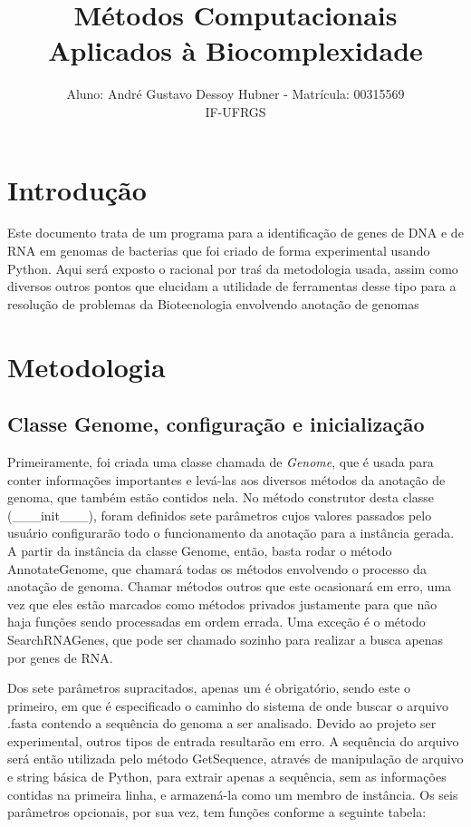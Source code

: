 \documentclass[brazilian,12pt,a4paper,final]{article}
\title{Métodos Computacionais Aplicados à Biocomplexidade}
\author{Aluno: André Gustavo Dessoy Hubner - Matrícula: 00315569 \\ IF-UFRGS}
\begin{document}
	\maketitle
	
	\section{Introdu\c{c}\~ao} 
	\indent 
	Este documento trata de um programa para a identificação de genes de DNA e de RNA em genomas
	de bacterias que foi criado de forma experimental usando Python.
	Aqui será exposto o racional por traś da metodologia usada, assim como diversos outros pontos que
	elucidam a utilidade de ferramentas desse tipo para a resolução de problemas da Biotecnologia
	envolvendo anotação de genomas
	
	\section{Metodologia}
	\subsection{Classe Genome, configuração e inicialização}
	\indent
	Primeiramente, foi criada uma classe chamada de \textit{Genome}, que é usada para conter informações
	importantes e levá-las aos diversos métodos da anotação de genoma, que também estão contidos nela. No
	método construtor desta classe (\_\_\_init\_\_\_), foram definidos sete parâmetros cujos valores passados 
	pelo usuário configurarão todo o funcionamento da anotação para a instância gerada. A partir da instância
	da classe Genome, então, basta rodar o método AnnotateGenome, que chamará todas os métodos envolvendo 
	o processo da anotação de genoma. Chamar métodos outros que este ocasionará em erro, uma vez que eles estão
	marcados como métodos privados justamente para que não haja funções sendo processadas em ordem errada. Uma 
	exceção é o método SearchRNAGenes, que pode ser chamado sozinho para realizar a busca apenas por genes de
	RNA.
	
	\vspace{0.5cm}
	
	Dos sete parâmetros supracitados, apenas um é obrigatório, sendo este o primeiro, em que é especificado o caminho
	do sistema de onde buscar o arquivo .fasta contendo a sequência do genoma a ser analisado. Devido ao projeto ser
	experimental, outros tipos de entrada resultarão em erro. A sequência do arquivo será então utilizada pelo método
	GetSequence, através de manipulação de arquivo e string básica de Python, para extrair apenas a sequência, sem as informações
	contidas na primeira linha, e armazená-la como um membro de instância. Os seis parâmetros opcionais, por sua vez, tem funções 
	conforme a seguinte tabela:
	
\end{document}
